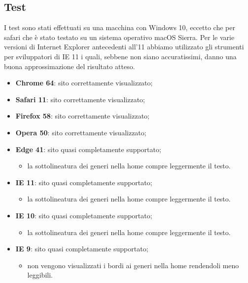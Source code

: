 \documentclass{tecweb}
\begin{document}
	\subsection{Test}
	I test sono stati effettuati su una macchina con Windows 10, eccetto che per safari che è stato testato su un sistema operativo macOS Sierra. Per le varie versioni di Internet Explorer antecedenti all'11 abbiamo utilizzato gli strumenti per sviluppatori di IE 11 i quali, sebbene non siano accuratissimi, danno una buona approssimazione del risultato atteso.
	\begin{itemize}
		\item \textbf{Chrome 64}: sito correttamente visualizzato;
		\item \textbf{Safari 11}: sito correttamente visualizzato;
		\item \textbf{Firefox 58}: sito correttamente visualizzato;
		\item \textbf{Opera 50}: sito correttamente visualizzato;
		\item \textbf{Edge 41}: sito quasi completamente supportato;
			\begin{itemize}
				\item la sottolineatura dei generi nella home compre leggermente il testo.
			\end{itemize}
	 	\item \textbf{IE 11}: sito quasi completamente supportato;
	 		\begin{itemize}
	 			\item la sottolineatura dei generi nella home compre leggermente il testo.
	 		\end{itemize}
	 	\item \textbf{IE 10}: sito quasi completamente supportato;
	 		\begin{itemize}
	 			\item la sottolineatura dei generi nella home compre leggermente il testo.
	 		\end{itemize}
	 	\item \textbf{IE 9}: sito quasi completamente supportato;
	 		\begin{itemize}
	 			\item non vengono visualizzati i bordi ai generi nella home rendendoli meno leggibili.
	 		\end{itemize}
	\end{itemize}
	\newpage
	\appendix
\end{document}
